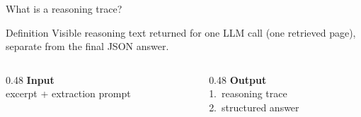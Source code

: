 \documentclass[aspectratio=169, 10pt]{beamer}
\begin{document}
\begin{frame}{What is a reasoning trace?}
\begin{block}{Definition}
Visible reasoning text returned for one LLM call
(one retrieved page), separate from the final JSON answer.
\end{block}
\vspace{0.6em}
\begin{columns}[T]
\begin{column}{0.48\textwidth}
\textbf{Input}\\
excerpt + extraction prompt
\end{column}
\begin{column}{0.48\textwidth}
\textbf{Output}\\
1.\ reasoning trace\\
2.\ structured answer
\end{column}
\end{columns}
\end{frame}
\end{document}
